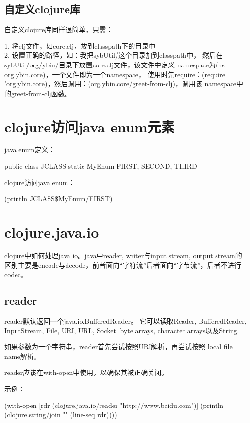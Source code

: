 ﻿\documentclass[a4paper,11pt]{article}
\begin{document}
  \subsection[自定义clojure库]{自定义clojure库}
  自定义clojure库同样很简单，只需：

  1. 将clj文件，如core.clj，放到classpath下的目录中\\
  2. 设置正确的路径，如：我把sybUtil/这个目录加到classpath中，
  然后在sybUtil/org/ybin/目录下放置core.clj文件，该文件中定义
  namespace为(ns org.ybin.core)，一个文件即为一个namespace，
  使用时先require：(require 'org.ybin.core)，然后调用：(org.ybin.core/greet-from-clj)，调用该
  namespace中的greet-from-clj函数。

  \section[clojure访问java enum元素]{clojure访问java enum元素}
  java enum定义：\par
  \begin{javacode}
public class JCLASS {
  static MyEnum {
    FIRST,
    SECOND,
    THIRD
  }
}
  \end{javacode}

  clojure访问java enum：\par
(println JCLASS\$MyEnum/FIRST)


  \section[clojure.java.io]{clojure.java.io}
  clojure中如何处理java io。java中reader, writer与input stream, output stream的
  区别主要是encode与decode，前者面向“字符流”后者面向“字节流”，后者不进行codec。
  
  \subsection[reader]{reader}
  reader默认返回一个java.io.BufferedReader。
  它可以读取Reader, BufferedReader, InputStream, File,
  URI, URL, Socket, byte arrays, character arrays以及String.

  如果参数为一个字符串，reader首先尝试按照URI解析，再尝试按照
  local file name解析。

  reader应该在with-open中使用，以确保其被正确关闭。

  示例：\\
  \begin{schemecode}
    (with-open [rdr (clojure.java.io/reader "http://www.baidu.com")]
      (println (clojure.string/join "\n" (line-seq rdr))))
  \end{schemecode}
\end{document}
